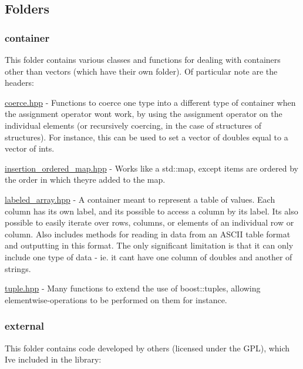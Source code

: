 \subsection*{Folders}

\subsubsection*{container}

This folder contains various classes and functions for dealing with containers other than vectors (which have their own folder). Of particular note are the headers\+:


\begin{DoxyItemize}
\item \hyperlink{coerce_8hpp}{coerce.\+hpp} -\/ Functions to coerce one type into a different type of container when the assignment operator won\textquotesingle{}t work, by using the assignment operator on the individual elements (or recursively coercing, in the case of structures of structures). For instance, this can be used to set a vector of doubles equal to a vector of ints.
\item \hyperlink{insertion__ordered__map_8hpp}{insertion\+\_\+ordered\+\_\+map.\+hpp} -\/ Works like a std\+::map, except items are ordered by the order in which they\textquotesingle{}re added to the map.
\item \hyperlink{labeled__array_8hpp}{labeled\+\_\+array.\+hpp} -\/ A container meant to represent a table of values. Each column has its own label, and it\textquotesingle{}s possible to access a column by its label. It\textquotesingle{}s also possible to easily iterate over rows, columns, or elements of an individual row or column. Also includes methods for reading in data from an A\+S\+C\+I\+I table format and outputting in this format. The only significant limitation is that it can only include one type of data -\/ ie. it can\textquotesingle{}t have one column of doubles and another of strings.
\item \hyperlink{tuple_8hpp}{tuple.\+hpp} -\/ Many functions to extend the use of boost\+::tuples, allowing elementwise-\/operations to be performed on them for instance.
\end{DoxyItemize}

\subsubsection*{external}

This folder contains code developed by others (licensed under the G\+P\+L), which I\textquotesingle{}ve included in the library\+:


